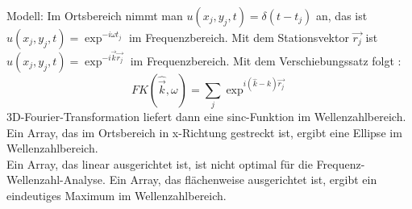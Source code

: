 Modell: Im Ortsbereich nimmt man $u(x_{j},y_{j},t) = \delta(t-t_{j})$ an, das ist $u(x_{j},y_{j},t)= \exp^{-i\omega t_{j}}$ im Frequenzbereich. Mit dem Stationsvektor $\vec{r_{j}}$ ist $u(x_{j},y_{j},t) = \exp^{-i\vec{k}\vec{r_{j}}}$  im Frequenzbereich.
Mit dem Verschiebungssatz folgt :
\begin{equation} FK(\hat{\vec{k}},\omega) = \sum_{j}\exp^{i( \hat{k}-k)\vec{r_{j}}}
\end{equation}
3D-Fourier-Transformation liefert dann eine sinc-Funktion im Wellenzahlbereich. Ein Array, das im Ortsbereich  in x-Richtung gestreckt ist, ergibt eine Ellipse im Wellenzahlbereich. \\
Ein Array, das linear ausgerichtet ist, ist nicht optimal für die Frequenz-Wellenzahl-Analyse. Ein Array, das flächenweise ausgerichtet ist, ergibt ein eindeutiges Maximum im Wellenzahlbereich.